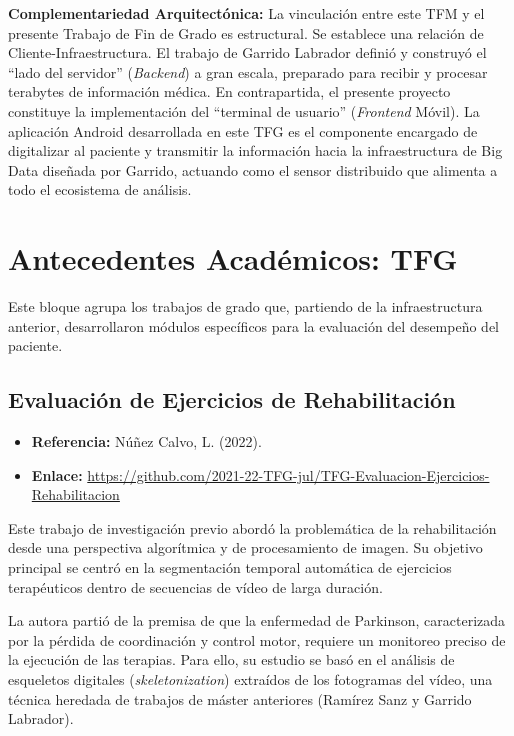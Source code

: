 \textbf{Complementariedad Arquitectónica:} La vinculación entre este TFM y el presente Trabajo de Fin de Grado es estructural. Se establece una relación de Cliente-Infraestructura. El trabajo de Garrido Labrador definió y construyó el ``lado del servidor'' (\textit{Backend}) a gran escala, preparado para recibir y procesar terabytes de información médica. En contrapartida, el presente proyecto constituye la implementación del ``terminal de usuario'' (\textit{Frontend} Móvil). La aplicación Android desarrollada en este TFG es el componente encargado de digitalizar al paciente y transmitir la información hacia la infraestructura de Big Data diseñada por Garrido, actuando como el sensor distribuido que alimenta a todo el ecosistema de análisis.

\section{Antecedentes Académicos: TFG}

Este bloque agrupa los trabajos de grado que, partiendo de la infraestructura anterior, desarrollaron módulos específicos para la evaluación del desempeño del paciente.

\subsection{Evaluación de Ejercicios de Rehabilitación}

\begin{itemize}
    \item \textbf{Referencia:} Núñez Calvo, L. (2022).
    \item \textbf{Enlace:} \url{https://github.com/2021-22-TFG-jul/TFG-Evaluacion-Ejercicios-Rehabilitacion}
\end{itemize}

Este trabajo de investigación previo abordó la problemática de la rehabilitación desde una perspectiva algorítmica y de procesamiento de imagen. Su objetivo principal se centró en la segmentación temporal automática de ejercicios terapéuticos dentro de secuencias de vídeo de larga duración.

La autora partió de la premisa de que la enfermedad de Parkinson, caracterizada por la pérdida de coordinación y control motor, requiere un monitoreo preciso de la ejecución de las terapias. Para ello, su estudio se basó en el análisis de esqueletos digitales (\textit{skeletonization}) extraídos de los fotogramas del vídeo, una técnica heredada de trabajos de máster anteriores (Ramírez Sanz y Garrido Labrador).

